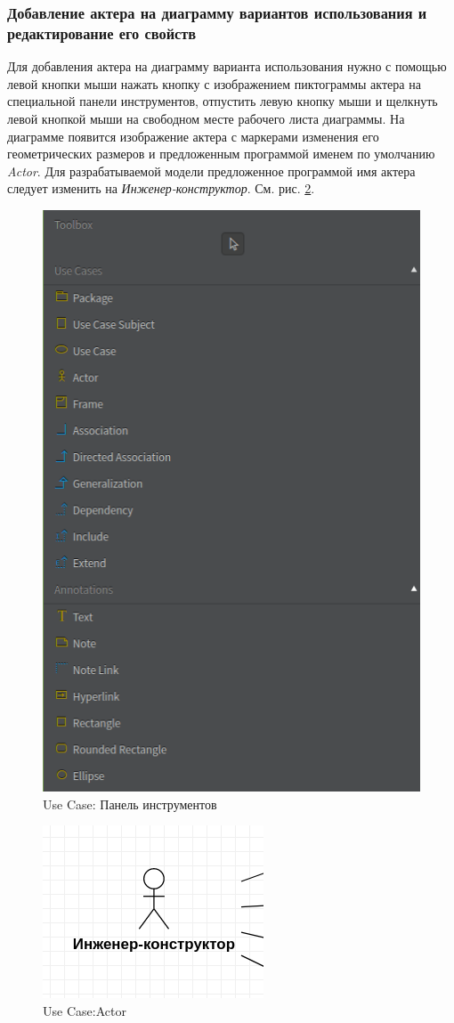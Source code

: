 \documentclass[a4paper,12pt]{report}
\begin{document}
\subsubsection*{Добавление актера на диаграмму вариантов использования и редактирование его свойств}
Для добавления актера на диаграмму варианта использования нужно с помощью левой кнопки мыши нажать кнопку с изображением пиктограммы актера на специальной панели инструментов, отпустить левую кнопку мыши и щелкнуть левой кнопкой мыши на свободном месте рабочего листа диаграммы. На диаграмме появится изображение актера с маркерами изменения его геометрических размеров и предложенным программой именем по умолчанию \textit{Actor}. Для разрабатываемой модели предложенное программой имя актера следует изменить на \textit{Инженер-конструктор}. См. рис. \ref{fig:actor1}.
\begin{figure}[htbp]
	\centering
	\includegraphics[width=0.4\linewidth]{images/toolboxusecase}
	\caption{Use Case: Панель инструментов}
	\label{fig:toolboxusecase}
\end{figure}
\begin{figure}
	\centering
	\includegraphics[width=0.3\linewidth]{images/actor1}
	\caption{Use Case:Actor}
	\label{fig:actor1}
\end{figure}
\end{document}

